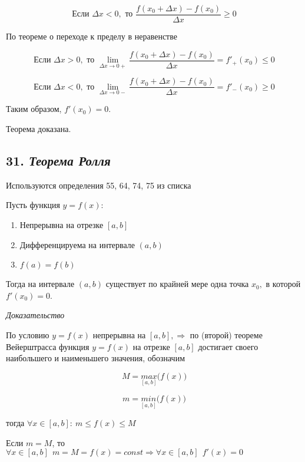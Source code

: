 $$
\text{Если } \Delta x < 0, \text{ то }{\dfrac{f(x_0+\Delta x) - f(x_0)}{\Delta x}} \geqslant 0
$$

По теореме о переходе к пределу в неравенстве

$$
\text{Если } \Delta x > 0, \text{ то } \lim\limits_{\Delta x \rightarrow 0+}{\dfrac{f(x_0 + \Delta x) - f(x_0)}{\Delta x}} = f'_+(x_0) \leqslant 0
$$

$$
\text{Если } \Delta x < 0, \text{ то }\lim\limits_{\Delta x \rightarrow 0-}{\dfrac{f(x_0 + \Delta x) - f(x_0)}{\Delta x}} = f'_-(x_0) \geqslant 0
$$

Таким образом, $f'(x_0) = 0$.

Теорема доказана.
\newpage 
\subsection*{31. \textit{Теорема Ролля}}
\begin{Quote2} 
\small\centering 

Используются определения 55, 64, 74, 75 из списка \end{Quote2} 

Пусть функция $y = f(x):$
\begin{enumerate}

\item Непрерывна на отрезке $[a, b]$
\item Дифференцируема на интервале $(a, b)$
\item $f(a) = f(b)$

\end{enumerate}

Тогда на интервале $(a, b)$ существует по крайней мере одна точка $x_0,$ в которой $f'(x_0) = 0$.
\vspace*{20pt} 

\textit{Доказательство}

По условию $y = f(x)$ непрерывна на $[a, b], \Rightarrow $ по (второй) теореме Вейерштрасса функция $y = f(x)$ на отрезке $[a,b]$ достигает своего наибольшего и наименьшего значения, обозначим

$$
M = \underset{[a, b]}{max}\big(f(x)\big)
$$

$$
m = \underset{[a, b]}{min}\big(f(x)\big)
$$

тогда $\forall x \in [a, b] : \ m \leqslant f(x) \leqslant M$

Если $m = M$, то $\forall x \in [a, b] \ \ m = M = f(x) = const \Rightarrow \forall x \in [a, b] \ \ f'(x) = 0$

